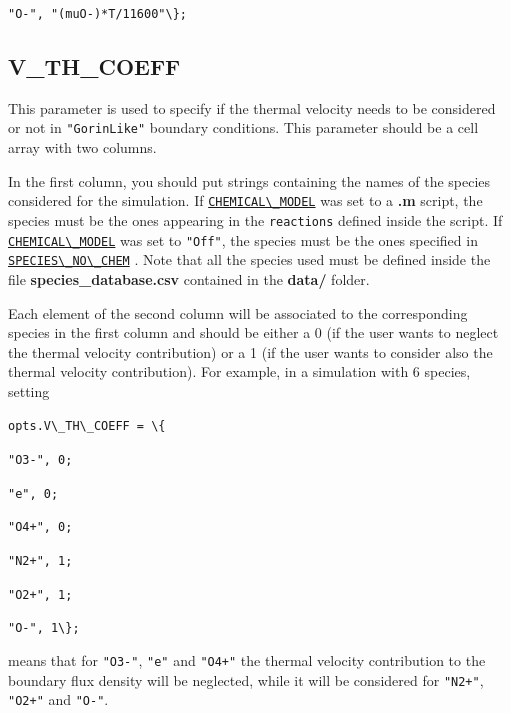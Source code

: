 \documentclass[12pt,a4paper]{article}
\newcommand{\matlabs}[1]{{\lstinline[style=MatlabStyle]!#1!}}
\newcommand{\seclink}[2]{%
	\begingroup
	\hypersetup{linkcolor=orange}%
	\hyperref[sec:#1]{\matlabs{#2}}%
	\endgroup
}
\begin{document}
	\hspace{40pt} \matlabs{"O-", "(muO-)*T/11600"\};}
	
	\subsection{V\_TH\_COEFF}
	\label{sec:vthcoeff}
	This parameter is used  to specify if the thermal velocity needs to be considered or not in \matlabs{"GorinLike"} boundary conditions.
	This parameter should be a cell array with two columns.
	
	In the first column, you should put strings containing the names of the species considered for the simulation. If \seclink{chemicalmodel}{CHEMICAL\_MODEL} was set to a \textbf{.m} script, the species must be the ones appearing in the \matlabs{reactions} defined inside the script.
	If \seclink{chemicalmodel}{CHEMICAL\_MODEL} was set to \matlabs{"Off"}, the species must be the ones specified in \seclink{speciesnochem}{SPECIES\_NO\_CHEM}. Note that all the species used must be defined inside the file \textbf{species\_database.csv} contained in the \textbf{data/} folder.
	
	Each element of the second column will be associated to the corresponding species in the first column and should be either a 0 (if the user wants to neglect the thermal velocity contribution) or a 1 (if the user wants to consider also the thermal velocity contribution). 
	For example, in a simulation with 6 species, setting
	
	\matlabs{opts.V\_TH\_COEFF = \{}

	\hspace{40pt} \matlabs{"O3-", 0;} 
	
	\hspace{40pt} \matlabs{"e", 0;}
	
	\hspace{40pt} \matlabs{"O4+", 0;}
	
	\hspace{40pt} \matlabs{"N2+", 1;} 
	
	\hspace{40pt} \matlabs{"O2+", 1;}
	
	\hspace{40pt} \matlabs{"O-", 1\};}
	
	\noindent means that for \matlabs{"O3-"}, \matlabs{"e"} and \matlabs{"O4+"} the thermal velocity contribution to the boundary flux density will be neglected, while it will be considered for \matlabs{"N2+"}, \matlabs{"O2+"} and \matlabs{"O-"}.
	
\end{document}
